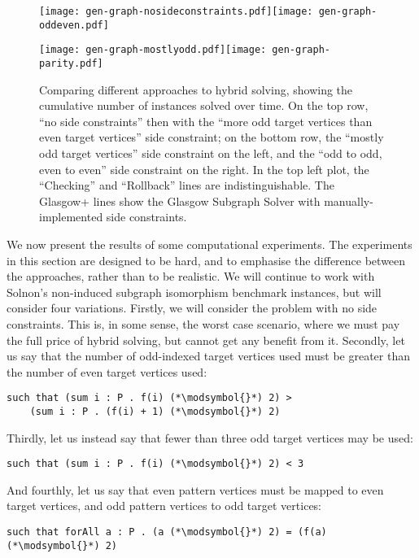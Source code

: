 \documentclass[runningheads]{llncs}
\begin{document}
\begin{figure}[p]
    \texttt{[image: gen-graph-nosideconstraints.pdf]}\hfill\texttt{[image: gen-graph-oddeven.pdf]}

    \bigskip

    \texttt{[image: gen-graph-mostlyodd.pdf]}\hfill\texttt{[image: gen-graph-parity.pdf]}
    \caption{Comparing different approaches to hybrid solving, showing the cumulative number of
    instances solved over time. On the top row, ``no side constraints'' then with the ``more odd
    target vertices than even target vertices'' side constraint; on the bottom row, the ``mostly odd
    target vertices'' side constraint on the left, and the ``odd to odd, even to even'' side
    constraint on the right. In the top left plot, the ``Checking'' and ``Rollback'' lines are
    indistinguishable. The Glasgow+ lines show the Glasgow Subgraph Solver with
    manually-implemented side constraints.}\label{figure:cumulative}
\end{figure}

We now present the results of some computational experiments. The experiments in this section are
designed to be hard, and to emphasise the difference between the approaches, rather
than to be realistic. We will continue to work with Solnon's non-induced subgraph isomorphism
benchmark instances, but will consider four variations. Firstly, we will consider the problem with
no side constraints. This is, in some sense, the worst case scenario, where we must pay the full
price of hybrid solving, but cannot get any benefit from it. Secondly, let us say that the number of
odd-indexed target vertices used must be greater than the number of even target vertices used:
\newcommand{\modsymbol}{\%}
\begin{lstlisting}
such that (sum i : P . f(i) (*\modsymbol{}*) 2) >
    (sum i : P . (f(i) + 1) (*\modsymbol{}*) 2)
\end{lstlisting}
Thirdly, let us instead say that fewer than three odd target vertices may be used:
\begin{lstlisting}
such that (sum i : P . f(i) (*\modsymbol{}*) 2) < 3
\end{lstlisting}
And fourthly, let us say that even pattern vertices must be mapped to even target vertices, and odd
pattern vertices to odd target vertices:
\begin{lstlisting}
such that forAll a : P . (a (*\modsymbol{}*) 2) = (f(a) (*\modsymbol{}*) 2)
\end{lstlisting}
\end{document}
